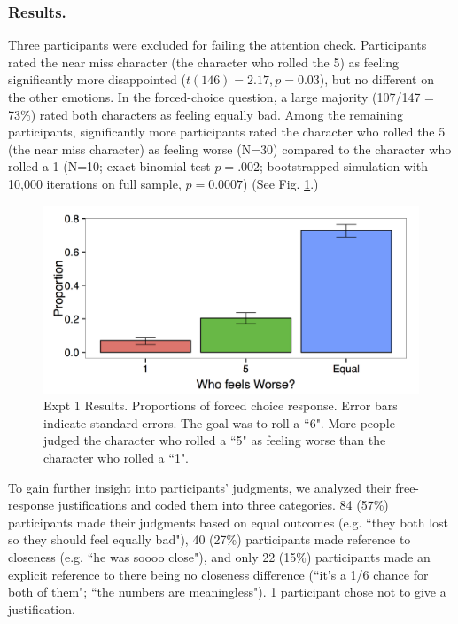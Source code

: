 \documentclass[10pt,letterpaper]{article}
\begin{document}
\subsubsection{Results.} Three participants were excluded for failing the attention check. Participants rated the near miss character (the character who rolled the 5) as feeling significantly more disappointed ($t(146)=2.17, p=0.03$), but no different on the other emotions. In the forced-choice question, a large majority (107/147 = 73\%) rated both characters as feeling equally bad. Among the remaining participants, significantly more participants rated the character who rolled the 5 (the near miss character) as feeling worse (N=30) compared to the character who rolled a 1 (N=10; exact binomial test $p=.002$; bootstrapped simulation with 10,000 iterations on full sample, $p=0.0007$) (See Fig. \ref{Expt1ResultFig}.)

\begin{figure}[htb!]
\includegraphics[width=\columnwidth]{images/Expt1results.png}
\caption{ Expt 1 Results. Proportions of forced choice response. Error bars indicate standard errors. The goal was to roll a ``6". More people judged the character who rolled a ``5" as feeling worse than the character who rolled a ``1".}
\label{Expt1ResultFig}
\end{figure}

	To gain further insight into participants' judgments, we analyzed their free-response justifications and coded them into three categories. 84 (57\%) participants made their judgments based on equal outcomes (e.g. ``they both lost so they should feel equally bad"), 40 (27\%) participants made reference to closeness (e.g. ``he was soooo close"), and only 22 (15\%) participants made an explicit reference to there being no closeness difference (``it's a 1/6 chance for both of them"; ``the numbers are meaningless"). 1 participant chose not to give a justification. 
\end{document}

